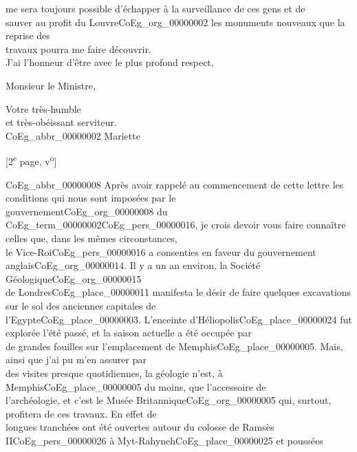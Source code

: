 \documentclass{book}
\begin{document}
me sera toujours possible d’échapper à la surveillance de ces gens et de\\
sauver au profit du Louvre\gls{CoEg_org_00000002} les monuments nouveaux que la reprise des\\
travaux pourra me faire découvrir.\\
\indent J’ai l’honneur d’être avec le plus profond respect,
\begin{center}Monsieur le Ministre,\end{center}
\begin{center}\hspace{5cm}Votre très-humble\\
\hspace{5cm}et très-obéissant serviteur.\\
\hspace{5cm}\gls{CoEg_abbr_00000002} Mariette\end{center}
{\footnotesize\begin{center} {[2\textsuperscript{e} page, v\textsuperscript{o}]}\end{center}}
\noindent \gls{CoEg_abbr_00000008} Après avoir rappelé au commencement de cette lettre les conditions qui nous sont imposées par le\\
gouvernement\gls{CoEg_org_00000008} du \gls{CoEg_term_00000002}\gls{CoEg_pers_00000016}, je crois devoir vous faire connaître celles que, dans les mêmes circonstances,\\
le Vice-Roi\gls{CoEg_pers_00000016} a consenties en faveur du gouvernement anglais\gls{CoEg_org_00000014}. Il y a un an environ, la Société Géologique\gls{CoEg_org_00000015}\\
de Londres\gls{CoEg_place_00000011} manifesta le désir de faire quelques excavations sur le sol des anciennes capitales de\\
l’Egypte\gls{CoEg_place_00000003}. L’enceinte d’Héliopolis\gls{CoEg_place_00000024} fut explorée l’été passé, et la saison actuelle a été occupée par\\
de grandes fouilles sur l’emplacement de Memphis\gls{CoEg_place_00000005}. Mais, ainsi que j’ai pu m’en assurer par\\
des visites presque quotidiennes, la géologie n’est, à Memphis\gls{CoEg_place_00000005} du moins, que l’accessoire de\\
l’archéologie, et c’est le Musée Britannique\gls{CoEg_org_00000005} qui, surtout, profitera de ces travaux. En effet de\\
longues tranchées ont été ouvertes autour du colosse de Ramsès II\gls{CoEg_pers_00000026} à Myt-Rahyneh\gls{CoEg_place_00000025} et poussées\\
\end{document}
